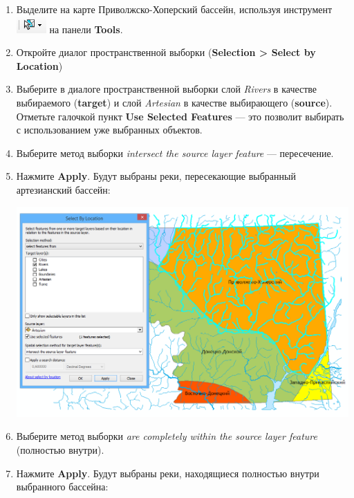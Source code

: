 \documentclass[12pt,]{book}
\begin{document}
\begin{enumerate}
\def\labelenumi{\arabic{enumi}.}
\item
  Выделите на карте Приволжско-Хоперский бассейн, используя инструмент \includegraphics{images/Ex06/image15.png} на панели \textbf{Tools}.
\item
  Откройте диалог пространственной выборки (\textbf{Selection \textgreater{} Select by Location})
\item
  Выберите в диалоге пространственной выборки слой \emph{Rivers} в качестве выбираемого (\textbf{target}) и слой \emph{Artesian} в качестве выбирающего (\textbf{source}). Отметьте галочкой пункт \textbf{Use Selected Features} --- это позволит выбирать с использованием уже выбранных объектов.
\item
  Выберите метод выборки \emph{intersect the source layer feature} --- пересечение.
\item
  Нажмите \textbf{Apply}. Будут выбраны реки, пересекающие выбранный артезианский бассейн:

  \includegraphics{images/Ex06/image16.png}
\item
  Выберите метод выборки \emph{are completely within the source layer feature} (полностью внутри).
\item
  Нажмите \textbf{Apply}. Будут выбраны реки, находящиеся полностью внутри выбранного бассейна:


\end{enumerate}
\end{document}
